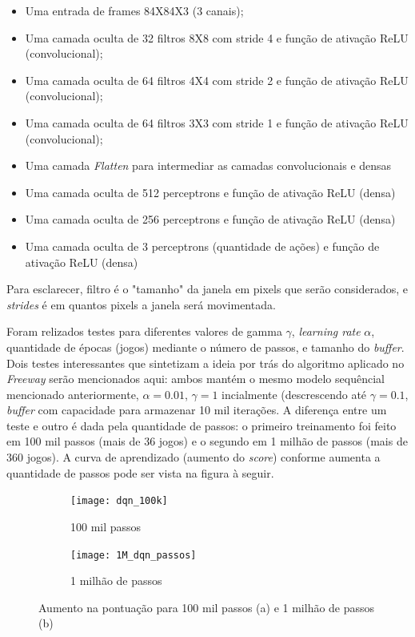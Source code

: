 \documentclass[letterpaper]{article} %
\begin{document}
\begin{itemize}
	\item Uma entrada de frames 84X84X3 (3 canais);
	\item Uma camada oculta de 32 filtros 8X8 com stride 4 e função de ativação ReLU (convolucional);
	\item Uma camada oculta de 64 filtros 4X4 com stride 2 e função de ativação ReLU (convolucional);
	\item Uma camada oculta de 64 filtros 3X3 com stride 1 e função de ativação ReLU (convolucional);
	\item Uma camada \textit{Flatten} para intermediar as camadas convolucionais e densas
	\item Uma camada oculta de 512 perceptrons e função de ativação ReLU (densa)
	\item Uma camada oculta de 256 perceptrons e função de ativação ReLU (densa)
	\item Uma camada oculta de 3 perceptrons (quantidade de ações) e função de ativação ReLU (densa)
\end{itemize}

Para esclarecer, filtro é o "tamanho" da janela em pixels que serão considerados, e \textit{strides} é em quantos pixels a janela será movimentada.

Foram relizados testes para diferentes valores de gamma $\gamma$, \textit{learning rate} $\alpha$, quantidade de épocas (jogos) mediante o número de passos, e tamanho do \textit{buffer}. Dois testes interessantes que sintetizam a ideia por trás do algoritmo aplicado no \textit{Freeway} serão mencionados aqui: ambos mantém o mesmo modelo sequêncial mencionado anteriormente, $\alpha = 0.01$, $\gamma = 1$ incialmente (descrescendo até $\gamma = 0.1$, \textit{buffer} com capacidade para armazenar 10 mil iterações. A diferença entre um teste e outro é dada pela quantidade de passos: o primeiro treinamento foi feito em 100 mil passos (mais de 36 jogos) e o segundo em 1 milhão de passos (mais de 360 jogos). A curva de aprendizado (aumento do \textit{score}) conforme aumenta a quantidade de passos pode ser vista na figura à seguir.

\begin{figure}[h]
     \begin{subfigure}[h]{0.2\textwidth}
         \centering
         \texttt{[image: dqn\_100k]}
         \caption{100 mil passos}
     \end{subfigure}
     \hfill
     \begin{subfigure}[h]{0.2\textwidth}
         \texttt{[image: 1M\_dqn\_passos]}
         \caption{1 milhão de passos}
     \end{subfigure}
        \caption{Aumento na pontuação para 100 mil passos (a) e 1 milhão de passos (b)}
\end{figure}
\end{document}
